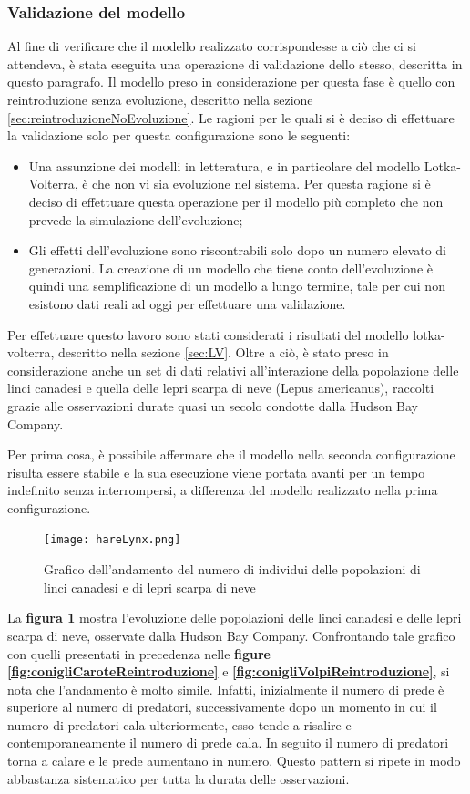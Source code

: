 \documentclass[11pt]{article}
\begin{document}
\subsubsection{Validazione del modello}
Al fine di verificare che il modello realizzato corrispondesse a ciò che ci si attendeva, è stata eseguita una operazione di validazione dello stesso, descritta in questo paragrafo.
Il modello preso in considerazione per questa fase è quello con reintroduzione senza evoluzione, descritto nella sezione \ref{sec:reintroduzioneNoEvoluzione}. 
Le ragioni per le quali si è deciso di effettuare la validazione solo per questa configurazione sono le seguenti:
\begin{itemize}
    \item Una assunzione dei modelli in letteratura, e in particolare del modello Lotka-Volterra, è che non vi sia evoluzione nel sistema. Per questa ragione si è deciso di effettuare questa operazione per il modello più completo che non prevede la simulazione dell'evoluzione;
    \item Gli effetti dell'evoluzione sono riscontrabili solo dopo un numero elevato di generazioni. La creazione di un modello che tiene conto dell'evoluzione è quindi una semplificazione di un modello a lungo termine, tale per cui non esistono dati reali ad oggi per effettuare una validazione. 
\end{itemize}
Per effettuare questo lavoro sono stati considerati i risultati del modello lotka-volterra, descritto nella sezione \ref{sec:LV}. Oltre a ciò, è stato preso in considerazione anche un set di dati relativi all'interazione della popolazione delle linci canadesi e quella delle lepri scarpa di neve (Lepus americanus), raccolti grazie alle osservazioni durate quasi un secolo condotte dalla Hudson Bay Company\cite{HareLynxData}.  

Per prima cosa, è possibile affermare che il modello nella seconda configurazione risulta essere stabile e la sua esecuzione viene portata avanti per un tempo indefinito senza interrompersi, a differenza del modello realizzato nella prima configurazione.

\begin{figure}[h!]
     \centering
     \texttt{[image: hareLynx.png]}
     \caption{Grafico dell'andamento del numero di individui delle popolazioni di linci canadesi e di lepri scarpa di neve}
     \label{fig:hareLynx}
\end{figure}

La \textbf{figura \ref{fig:hareLynx}} mostra l'evoluzione delle popolazioni delle linci canadesi e delle lepri scarpa di neve, osservate dalla Hudson Bay Company\cite{HareLynx}. Confrontando tale grafico con quelli presentati in precedenza nelle\textbf{ figure \ref{fig:conigliCaroteReintroduzione}} e \textbf{\ref{fig:conigliVolpiReintroduzione}}, si nota che l'andamento è molto simile. Infatti, inizialmente il numero di prede è superiore al numero di predatori, successivamente dopo un momento in cui il numero di predatori cala ulteriormente, esso  tende a risalire e contemporaneamente il numero di prede cala. In seguito il numero di predatori torna a calare e le prede aumentano in numero. Questo pattern si ripete in modo abbastanza sistematico per tutta la durata delle osservazioni. 
\end{document}
